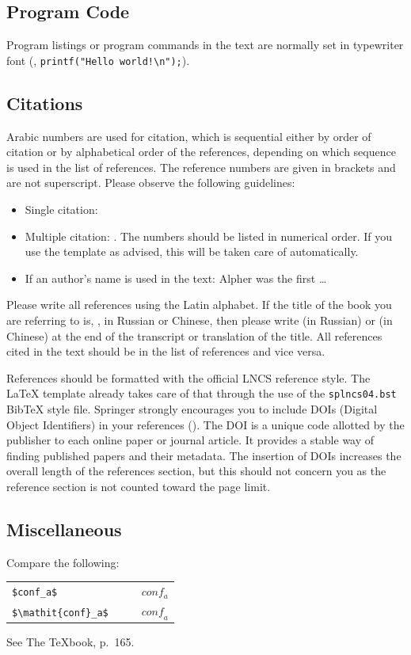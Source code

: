 \documentclass[runningheads]{llncs}
\begin{document}
\subsection{Program Code}
Program listings or program commands in the text are normally set in typewriter font (\eg, \texttt{printf("Hello world!\textbackslash{}n");}).


\subsection{Citations}
Arabic numbers are used for citation, which is sequential either by order of citation or by alphabetical order of the references, depending on which sequence is used in the list of references. 
The reference numbers are given in brackets and are not superscript.
Please observe the following guidelines:
\begin{itemize}
\item Single citation: \cite{Authors14}
\item Multiple citation: \cite{Alpher02,Alpher03,Alpher05,Authors14b,Authors14}. 
  The numbers should be listed in numerical order.
  If you use the template as advised, this will be taken care of automatically.
\item If an author's name is used in the text: Alpher \cite{Alpher02} was the first \ldots
\end{itemize}
Please write all references using the Latin alphabet. If the title of the book you are referring to is, \eg, in Russian or Chinese, then please write (in Russian) or (in Chinese) at the end of the transcript or translation of the title.
All references cited in the text should be in the list of references and vice versa.

References should be formatted with the official LNCS reference style.
The \LaTeX{} template already takes care of that through the use of the \texttt{splncs04.bst} Bib\TeX{} style file.
Springer strongly encourages you to include DOIs (Digital Object Identifiers) in your references (\cf \cite{ECCV2022}). 
The DOI is a unique code allotted by the publisher to each online paper or journal article. 
It provides a stable way of finding published papers and their metadata. 
The insertion of DOIs increases the overall length of the references section, but this should not concern you as the reference section is not counted toward the page limit.


\subsection{Miscellaneous}
Compare the following:
\begin{center}
  \begin{tabular}{ll}
    \verb'$conf_a$'          & $\qquad conf_a$ \\
    \verb'$\mathit{conf}_a$' & $\qquad \mathit{conf}_a$
  \end{tabular}
\end{center}
See The \TeX book, p.\ 165.
\end{document}
